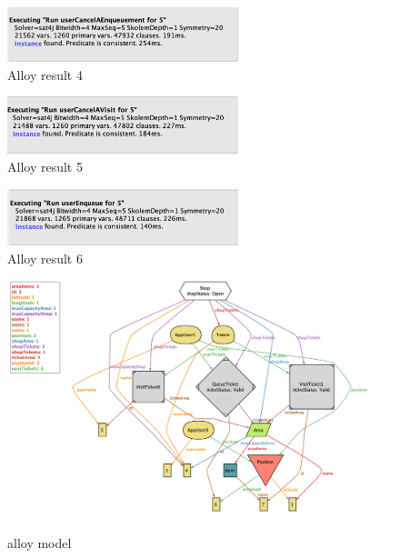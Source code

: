 \begin{figure}[h!]
    \centering
    \includegraphics[width=0.6\textwidth]{Images/alloy/usercancelsanenqueuement.png}
    \caption{\label{fig:usercancelsanenqueuementalloy}{Alloy result 4}}
\end{figure}

\begin{figure}[h!]
    \centering
    \includegraphics[width=0.6\textwidth]{Images/alloy/usercancelsavisit.png}
    \caption{\label{fig:usercancelsavisitalloy}{Alloy result 5}}
\end{figure}

\begin{figure}[h!]
    \centering
    \includegraphics[width=0.6\textwidth]{Images/alloy/userenqueue.png}
    \caption{\label{fig:usernenqueuealloy}{Alloy result 6}}
\end{figure}

\begin{figure}[h!]
\centering
    \includegraphics[width=\textwidth]{Images/alloy/alloymodel.png}
    \caption{\label{fig:alloymodel}{alloy model}}
\end{figure}

\FloatBarrier